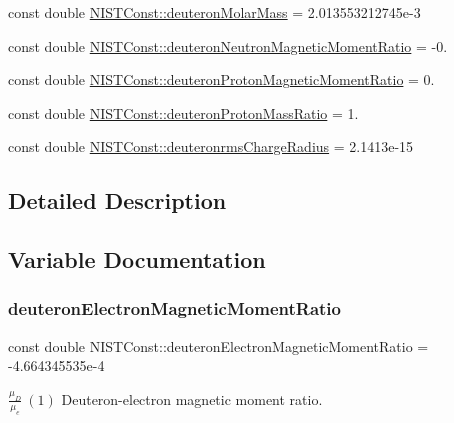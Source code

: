 \begin{DoxyCompactItemize}
\item 
const double \hyperlink{group___deuteron_ga19086965236aae3504b4c0efb1cfaf41}{N\+I\+S\+T\+Const\+::deuteron\+Molar\+Mass} = 2.\+013553212745e-\/3
\item 
const double \hyperlink{group___deuteron_gaad8a0231ec17f5669c9c22a4daba5a77}{N\+I\+S\+T\+Const\+::deuteron\+Neutron\+Magnetic\+Moment\+Ratio} = -\/0.
\item 
const double \hyperlink{group___deuteron_gaac523a6a3c61390396544e4b0acb3c05}{N\+I\+S\+T\+Const\+::deuteron\+Proton\+Magnetic\+Moment\+Ratio} = 0.
\item 
const double \hyperlink{group___deuteron_gabe2731d4997c2227da2cc2d7e7cda194}{N\+I\+S\+T\+Const\+::deuteron\+Proton\+Mass\+Ratio} = 1.
\item 
const double \hyperlink{group___deuteron_gaef4ebab0e996f7ac1934663efbd32aed}{N\+I\+S\+T\+Const\+::deuteronrms\+Charge\+Radius} = 2.\+1413e-\/15
\end{DoxyCompactItemize}


\subsection{Detailed Description}


\subsection{Variable Documentation}
\mbox{\label{group___deuteron_gaa01fffefa3ab64430fabf08808572689}} 
\subsubsection{\texorpdfstring{deuteron\+Electron\+Magnetic\+Moment\+Ratio}{deuteronElectronMagneticMomentRatio}}
{\footnotesize\ttfamily const double N\+I\+S\+T\+Const\+::deuteron\+Electron\+Magnetic\+Moment\+Ratio = -\/4.\+664345535e-\/4}

$\frac{\mu_D}{\mu_e} \ (1)$ Deuteron-\/electron magnetic moment ratio. \mbox{\label{group___deuteron_gaf25b1cce3ab8e1ec7f4f7790ea06ad0b}} 
